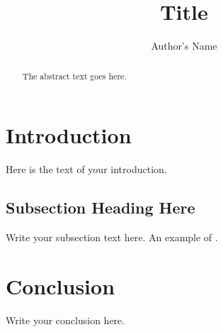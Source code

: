\documentclass{article}
\begin{document}
\title{Title}
\author{Author's Name}

\maketitle

\begin{abstract}
The abstract text goes here.
\end{abstract}

\section{Introduction}
Here is the text of your introduction.


\subsection{Subsection Heading Here}
Write your subsection text here.
An example of .


\section{Conclusion}
Write your conclusion here.
\end{document}
